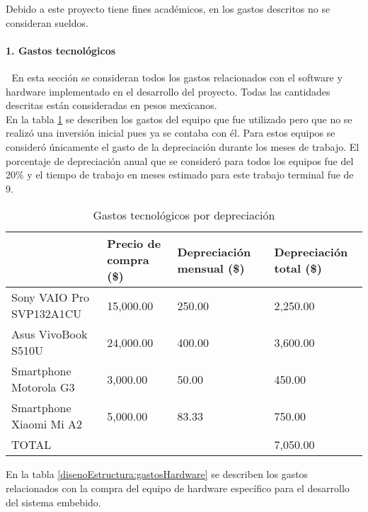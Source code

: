 Debido a este proyecto tiene fines académicos, en los gastos descritos no se consideran sueldos.


\paragraph{1. Gastos tecnológicos} \textcolor{White}{.} \newline
En esta sección se consideran todos los gastos relacionados con el software y hardware implementado en el desarrollo del proyecto. Todas las cantidades descritas están consideradas en pesos mexicanos.\\

En la tabla \ref{disenoEstructura:gastosDepreciacion} se describen los gastos del equipo que fue utilizado pero que no se realizó una inversión inicial pues ya se contaba con él. Para estos equipos se consideró únicamente el gasto de la depreciación durante los meses de trabajo. El porcentaje de depreciación anual que se consideró para todos los equipos fue del 20\% y el tiempo de trabajo en meses estimado para este trabajo terminal fue de 9. \\

\begin{table}[htbp]
	\begin{center}
		\begin{tabular}{|p{4cm}|p{3cm}|p{3cm}|p{3cm}|}
			\hline
			\thead{Equipo}&\thead{Precio de compra\\(\$)}&\thead{Depreciación mensual\\(\$)}&\thead{Depreciación total\\(\$)} \\
			\hline
			\hline
			Sony VAIO Pro SVP132A1CU &15,000.00 &250.00&2,250.00 \\
			\hline
			Asus VivoBook S510U & 24,000.00&400.00&3,600.00 \\
			\hline
			Smartphone Motorola G3 &3,000.00 &50.00&450.00\\
			\hline
			Smartphone Xiaomi Mi A2 & 5,000.00&83.33&750.00\\
			\hline
			\hline
			TOTAL & &&7,050.00\\
			\hline
		\end{tabular}
		\caption{Gastos tecnológicos por depreciación}
		\label{disenoEstructura:gastosDepreciacion}
	\end{center}
\end{table}

En la tabla \ref{disenoEstructura:gastosHardware} se describen los gastos relacionados con la compra del equipo de hardware específico para el desarrollo del sistema embebido.

